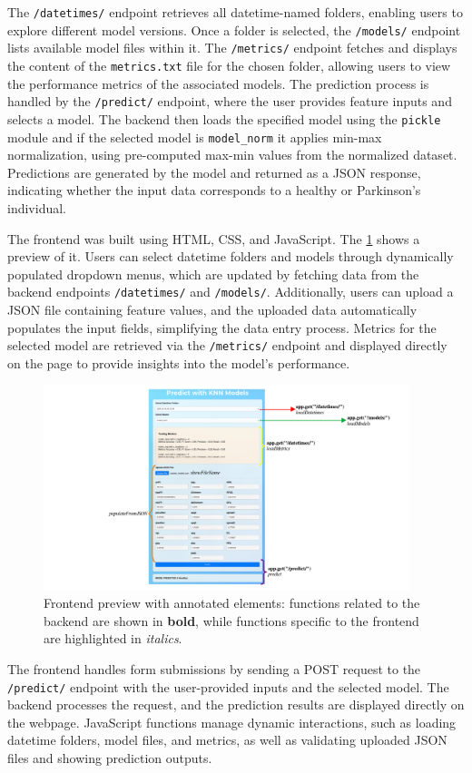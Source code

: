 The \texttt{/datetimes/} endpoint retrieves all datetime-named folders,
enabling users to explore different model versions. Once a folder is selected,
the \texttt{/models/} endpoint lists available model files within it. The
\texttt{/metrics/} endpoint fetches and displays the content of the
\texttt{metrics.txt} file for the chosen folder, allowing users to view the
performance metrics of the associated models. The prediction process is handled
by the \texttt{/predict/} endpoint, where the user provides feature inputs and
selects a model. The backend then loads the specified model using the
\texttt{pickle} module and if the selected model is \texttt{model\_norm} it
applies min-max normalization, using pre-computed max-min values from the
normalized dataset. Predictions are generated by the model and returned as a
JSON response, indicating whether the input data corresponds to a healthy or
Parkinson's individual.

The frontend was built using HTML, CSS, and JavaScript. The \cref{fig:fig5}
shows a preview of it. Users can select datetime folders and models through
dynamically populated dropdown menus, which are updated by fetching data from
the backend endpoints \texttt{/datetimes/} and \texttt{/models/}. Additionally,
users can upload a JSON file containing feature values, and the uploaded data
automatically populates the input fields, simplifying the data entry process.
Metrics for the selected model are retrieved via the \texttt{/metrics/}
endpoint and displayed directly on the page to provide insights into the
model's performance.

\begin{figure}[H]
	\centering
	\includegraphics[width=0.95\textwidth,height=0.30\textheight]{../images/api/frontend.png}
	\caption{Frontend preview with annotated elements: functions related to the
		backend are shown in \textbf{bold}, while functions specific to the frontend
		are highlighted in \textit{italics}.}
	\label{fig:fig5}
\end{figure}

The frontend handles form submissions by sending a POST request to the
\texttt{/predict/} endpoint with the user-provided inputs and the selected
model. The backend processes the request, and the prediction results are
displayed directly on the webpage. JavaScript functions manage dynamic
interactions, such as loading datetime folders, model files, and metrics, as
well as validating uploaded JSON files and showing prediction outputs.
